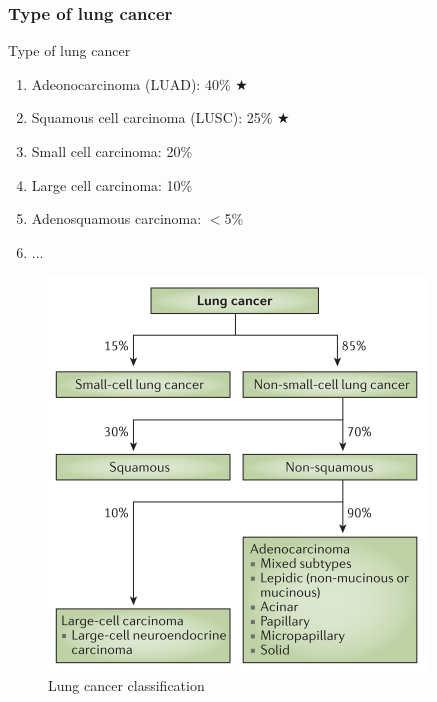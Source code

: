 \documentclass{beamer}
\begin{document}
            \begin{frame}[allowframebreaks]
                \frametitle{Type of lung cancer}

                \begin{block}{Type of lung cancer \\
                    \cite{lung-02}}
                    \begin{enumerate}
                        \item Adeonocarcinoma (LUAD): 40\% $\bigstar$
                        \item Squamous cell carcinoma (LUSC): 25\% $\bigstar$
                        \item Small cell carcinoma: 20\%
                        \item Large cell carcinoma: 10\%
                        \item Adenosquamous carcinoma: $<$5\%
                        \item ...
                    \end{enumerate}
                \end{block}

                \begin{figure}
                    \includegraphics[width=0.4 \linewidth]{figures/LungCancer/classification.png}
                    \caption{Lung cancer classification \cite{lung-03}}
                \end{figure}
            \end{frame}
\end{document}
